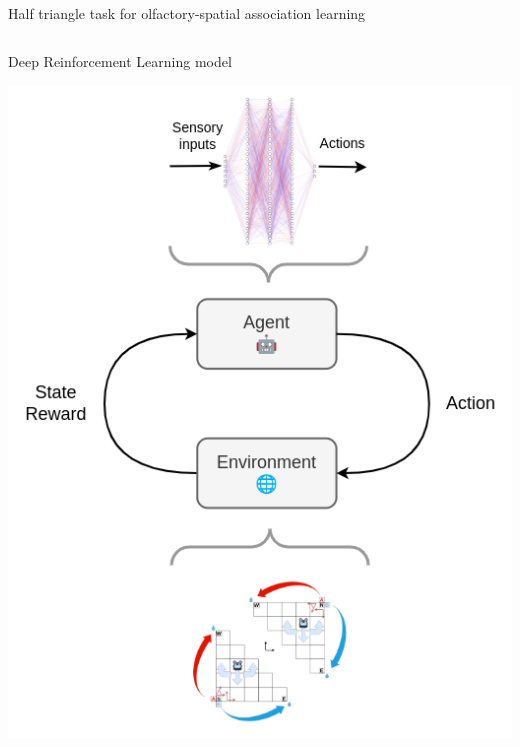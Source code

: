 \documentclass[bigger]{beamer}
\begin{document}
\begin{frame}[label={sec:org2840a5c}]{Half triangle task for olfactory-spatial association learning}
\begin{columns}
\begin{column}[c]{0.33\columnwidth}
\end{column}
\end{columns}
\end{frame}
\begin{frame}[label={sec:org1e376a0}]{Deep Reinforcement Learning model}
\begin{center}
\includegraphics[height=0.95\textheight]{img/nn.drawio.png}
\end{center}
\end{frame}
\end{document}
